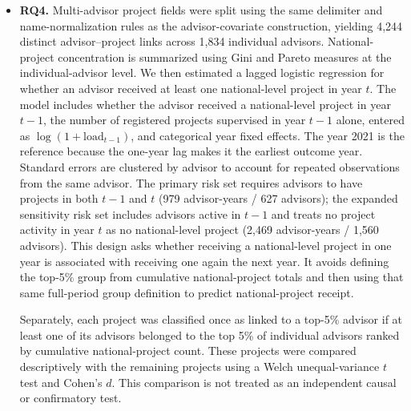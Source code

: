 \documentclass[pdflatex,sn-apa]{sn-jnl}
\begin{document}
\begin{itemize}
Advisor-level dependence was examined separately among single-advisor projects. After restricting the data to complete cases, we combined academic-unit fixed effects with standard errors clustered by advisor; this allows for the possibility that projects supervised by the same advisor have related outcomes. We repeated the clustering using academic-unit-by-normalized-advisor-name identifiers to reduce the risk of treating different people with the same name as one advisor. We also examined a crossed random-intercept model with separate terms for academic units and advisors. This model reached a boundary solution, with the academic-unit variance estimated at zero. Because it did not provide a separately estimated variance for both sources of clustering in this restricted sample, we report it only as a diagnostic check and do not use it for substantive inference.

\item \textbf{RQ4.} Multi-advisor project fields were split using the same delimiter and name-normalization rules as the advisor-covariate construction, yielding 4,244 distinct advisor--project links across 1,834 individual advisors. National-project concentration is summarized using Gini and Pareto measures at the individual-advisor level. We then estimated a lagged logistic regression for whether an advisor received at least one national-level project in year $t$. The model includes whether the advisor received a national-level project in year $t-1$, the number of registered projects supervised in year $t-1$ alone, entered as $\log(1+\mathrm{load}_{t-1})$, and categorical year fixed effects. The year 2021 is the reference because the one-year lag makes it the earliest outcome year. Standard errors are clustered by advisor to account for repeated observations from the same advisor. The primary risk set requires advisors to have projects in both $t-1$ and $t$ (979 advisor-years / 627 advisors); the expanded sensitivity risk set includes advisors active in $t-1$ and treats no project activity in year $t$ as no national-level project (2,469 advisor-years / 1,560 advisors). This design asks whether receiving a national-level project in one year is associated with receiving one again the next year. It avoids defining the top-5\% group from cumulative national-project totals and then using that same full-period group definition to predict national-project receipt.

Separately, each project was classified once as linked to a top-5\% advisor if at least one of its advisors belonged to the top 5\% of individual advisors ranked by cumulative national-project count. These projects were compared descriptively with the remaining projects using a Welch unequal-variance $t$ test and Cohen's $d$. This comparison is not treated as an independent causal or confirmatory test.
\end{itemize}
\end{document}
